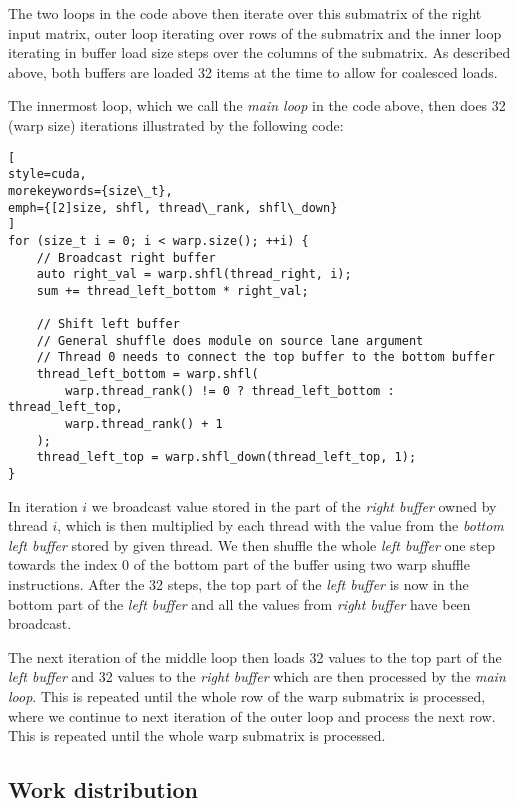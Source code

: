 The two loops in the code above then iterate over this submatrix of the right input matrix, outer loop iterating over rows of the submatrix and the inner loop iterating in buffer load size steps over the columns of the submatrix. As described above, both buffers are loaded 32 items at the time to allow for coalesced loads.


The innermost loop, which we call the \textit{main loop} in the code above, then does 32 (warp size) iterations illustrated by the following code:

\begin{lstlisting}[
style=cuda,
morekeywords={size\_t},
emph={[2]size, shfl, thread\_rank, shfl\_down}
]
for (size_t i = 0; i < warp.size(); ++i) {
	// Broadcast right buffer
	auto right_val = warp.shfl(thread_right, i);
	sum += thread_left_bottom * right_val;

	// Shift left buffer
	// General shuffle does module on source lane argument
	// Thread 0 needs to connect the top buffer to the bottom buffer
	thread_left_bottom = warp.shfl(
		warp.thread_rank() != 0 ? thread_left_bottom : thread_left_top,
		warp.thread_rank() + 1
	);
	thread_left_top = warp.shfl_down(thread_left_top, 1);
}
\end{lstlisting}

In iteration $i$ we broadcast value stored in the part of the \textit{right buffer} owned by thread $i$, which is then multiplied by each thread with the value from the \textit{bottom left buffer} stored by given thread. We then shuffle the whole \textit{left buffer} one step towards the index 0 of the bottom part of the buffer using two warp shuffle instructions. After the 32 steps, the top part of the \textit{left buffer} is now in the bottom part of the \textit{left buffer} and all the values from \textit{right buffer} have been broadcast. 

The next iteration of the middle loop then loads 32 values to the top part of the \textit{left buffer} and 32 values to the \textit{right buffer} which are then processed by the \textit{main loop}. This is repeated until the whole row of the warp submatrix is processed, where we continue to next iteration of the outer loop and process the next row. This is repeated until the whole warp submatrix is processed.

\subsection{Work distribution}
\label{sec:warp_shuffle_work_dist}


